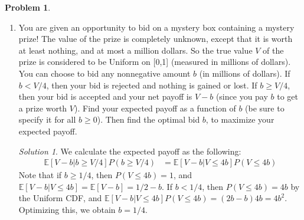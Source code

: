 \documentclass[11pt]{article}
\theoremstyle{definition}
\newtheorem{prob}[theo]{\color{Maroon} Problem}
\theoremstyle{remark}
\newtheorem*{soln}{\color{Maroon} Solution}
\newcommand{\E}[1]{\mathbb{E}\left[ #1 \right]}
\begin{document}
\pagebreak

\begin{prob}
\begin{enumerate}[label = (\alph*)]
    \item You are given an opportunity to bid on a mystery box containing a mystery prize! The value of the prize is completely unknown, except that it is worth at least nothing, and at most a million dollars. So the true value $V$ of the prize is considered to be Uniform on [0,1] (measured in millions of dollars). You can choose to bid any nonnegative amount $b$ (in millions of dollars). If $b < V/4$, then your bid is rejected and nothing is gained or lost. If $b \ge V/4$, then your bid is accepted and your net payoff is $V − b$ (since you pay $b$ to get a prize worth $V$). Find your expected payoff as a function of $b$ (be sure to specify it for all $b \ge 0$). Then find the optimal bid $b$, to maximize your expected payoff.
    
    \begin{soln} We calculate the expected payoff as the following:
    \begin{align*}
    \E{V - b | b \ge V/4}P(b \ge V/4)
    &= \E{V - b | V \le 4b}P(V \le 4b)
    \end{align*}
    Note that if $b \ge 1/4$, then $P(V \le 4b) = 1$, and $\E{V-b | V \le 4b} = \E{V - b} = 1/2 - b$. If $b < 1/4$, then $P(V \le 4b) = 4b$ by the Uniform CDF, and $\E{V - b | V \le 4b}P(V \le 4b) = (2b - b)4b = 4b^2$. Optimizing this, we obtain $b = 1/4$.
    \end{soln}
\end{enumerate}

\end{prob}

\pagebreak
\end{document}
